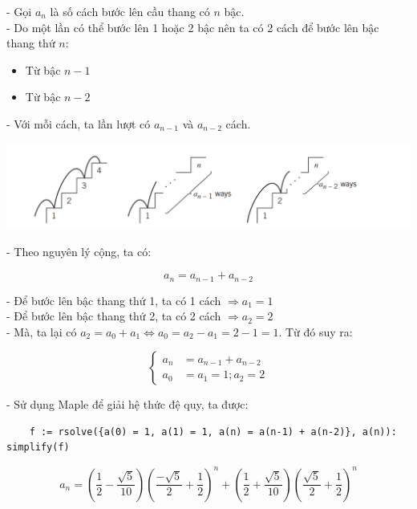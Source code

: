 \documentclass[12pt]{article}
\begin{document}
\begin{sloppypar}
- Gọi \(a_{n}\) là số cách bước lên cầu thang có \(n\) bậc. \\
- Do một lần có thể bước lên 1 hoặc 2 bậc nên ta có 2 cách để bước lên bậc thang thứ \(n\):

\begin{itemize}
    \item Từ bậc \(n - 1\)
    \item Từ bậc \(n - 2\)
\end{itemize}

- Với mỗi cách, ta lần lượt có \(a_{n-1}\) và \(a_{n - 2}\) cách. \\
\begin{center}
    {\includegraphics[width=16cm]{ex1a.png}}
\end{center}
- Theo nguyên lý cộng, ta có:

\begin{equation*}
    a_{n} = a_{n-1} + a_{n-2}
\end{equation*}

- Để bước lên bậc thang thứ 1, ta có 1 cách \(\Rightarrow a_{1} = 1\) \\
- Để bước lên bậc thang thứ 2, ta có 2 cách \(\Rightarrow a_{2} = 2\) \\
- Mà, ta lại có \(a_{2} = a_{0} + a_{1} \Leftrightarrow a_{0} = a_{2} - a_{1} = 2 - 1 = 1\). Từ đó suy ra:


    \[
    \begin{cases}
        a_{n} & = a_{n-1} + a_{n-2} \\             
        a_{0} & = a_{1} = 1; a_{2} = 2   
    \end{cases}
    \]

- Sử dụng Maple để giải hệ thức đệ quy, ta được:

\begin{verbatim}
    f := rsolve({a(0) = 1, a(1) = 1, a(n) = a(n-1) + a(n-2)}, a(n)): simplify(f)
\end{verbatim}

\begin{equation*}
    a_{n} = \left(\frac{1}{2} - \frac{\sqrt{5}}{10}\right)\left(\frac{-\sqrt{5}}{2} + \frac{1}{2}\right)^{n} + \left(\frac{1}{2} + \frac{\sqrt{5}}{10}\right)\left(\frac{\sqrt{5}}{2} + \frac{1}{2}\right)^{n}
\end{equation*}


\end{sloppypar}
\end{document}
